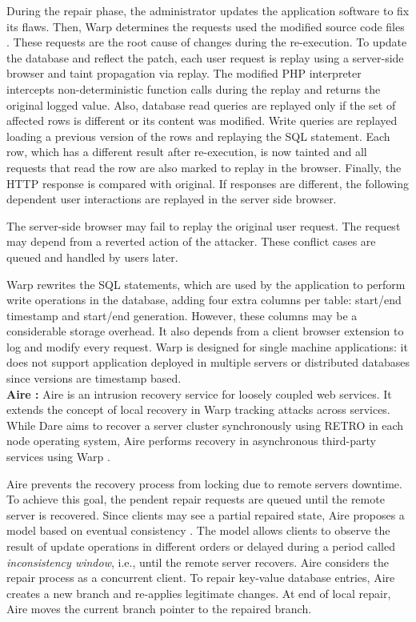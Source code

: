 During the repair phase, the administrator updates the application software to fix its flaws. Then, Warp determines the requests used the modified source code files \cite{poirot,Wang2011}. These requests are the root cause of changes during the re-execution. To update the database and reflect the patch, each user request is replay using a server-side browser and taint propagation via replay. The modified PHP interpreter intercepts non-deterministic function calls during the replay and returns the original logged value. Also, database read queries are replayed only if the set of affected rows is different or its content was modified. Write queries are replayed loading a previous version of the rows and replaying the SQL statement. Each row, which has a different result after re-execution, is now tainted and all requests that read the row are also marked to replay in the browser. Finally, the HTTP response is compared with original. If responses are different, the following dependent user interactions are replayed in the server side browser.

The server-side browser may fail to replay the original user request. The request may depend from a reverted action of the attacker. These conflict cases are queued and handled by users later. 

Warp rewrites the SQL statements, which are used by the application to perform write operations in the database, adding four extra columns per table: start/end timestamp and start/end generation. However, these columns may be a considerable storage overhead. It also depends from a client browser extension to log and modify every request. Warp is designed for single machine applications: it does not support application deployed in multiple servers or distributed databases since versions are timestamp based. \\


\textbf{Aire \cite{aire}:} Aire is an intrusion recovery service for loosely coupled web services. It extends the concept of local recovery in Warp \cite{warp} tracking attacks across services. While Dare \cite{dare} aims to recover a server cluster synchronously using RETRO \cite{retro} in each node operating system, Aire performs recovery in asynchronous third-party services using Warp \cite{warp}. 

Aire prevents the recovery process from locking due to remote servers downtime. To achieve this goal, the pendent repair requests are queued until the remote server is recovered. Since clients may see a partial repaired state, Aire proposes a model based on eventual consistency \cite{Decandia2007,Vogels2009}. The model allows clients to observe the result of update operations in different orders or delayed during a period called \textit{inconsistency window}, i.e., until the remote server recovers. Aire considers the repair process as a concurrent client. To repair key-value database entries, Aire creates a new branch \cite{git} and re-applies legitimate changes. At end of local repair, Aire moves the current branch pointer to the repaired branch.


